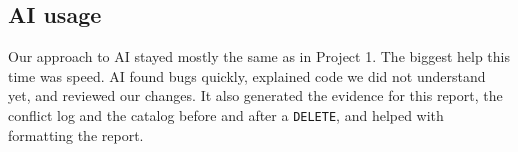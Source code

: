 \documentclass[11pt,a4paper,twocolumn]{article}
\begin{document}
\subsection{AI usage}

Our approach to AI stayed mostly the same as in Project 1. The biggest help this time was speed. AI found bugs quickly, explained code we did not understand yet, and reviewed our changes. It also generated the evidence for this report, the conflict log and the catalog before and after a \texttt{DELETE}, and helped with formatting the report.
\end{document}
